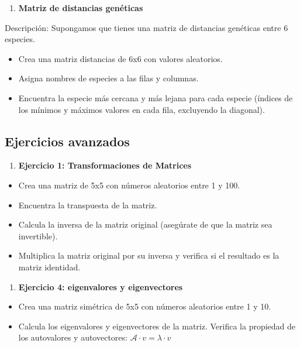 \documentclass[
]{book}
\providecommand{\tightlist}{%
  \setlength{\itemsep}{0pt}\setlength{\parskip}{0pt}}
\begin{document}
\begin{enumerate}
\def\labelenumi{\arabic{enumi}.}
\setcounter{enumi}{14}
\tightlist
\item
  \textbf{Matriz de distancias genéticas}
\end{enumerate}

Descripción: Supongamos que tienes una matriz de distancias genéticas entre 6 especies.

\begin{itemize}
\tightlist
\item
  Crea una matriz distancias de 6x6 con valores aleatorios.
\item
  Asigna nombres de especies a las filas y columnas.
\item
  Encuentra la especie más cercana y más lejana para cada especie (índices de los mínimos y máximos valores en cada fila, excluyendo la diagonal).
\end{itemize}

\subsection{Ejercicios avanzados}\label{ejercicios-avanzados-1}

\begin{enumerate}
\def\labelenumi{\arabic{enumi}.}
\tightlist
\item
  \textbf{Ejercicio 1: Transformaciones de Matrices}
\end{enumerate}

\begin{itemize}
\tightlist
\item
  Crea una matriz de 5x5 con números aleatorios entre 1 y 100.
\item
  Encuentra la transpuesta de la matriz.
\item
  Calcula la inversa de la matriz original (asegúrate de que la matriz sea invertible).
\item
  Multiplica la matriz original por su inversa y verifica si el resultado es la matriz identidad.
\end{itemize}

\begin{enumerate}
\def\labelenumi{\arabic{enumi}.}
\setcounter{enumi}{1}
\tightlist
\item
  \textbf{Ejercicio 4: eigenvalores y eigenvectores}
\end{enumerate}

\begin{itemize}
\tightlist
\item
  Crea una matriz simétrica de 5x5 con números aleatorios entre 1 y 10.
\item
  Calcula los eigenvalores y eigenvectores de la matriz.
  Verifica la propiedad de los autovalores y autovectores:
  \(\mathcal A⋅v=λ⋅v\)
\end{itemize}
\end{document}
